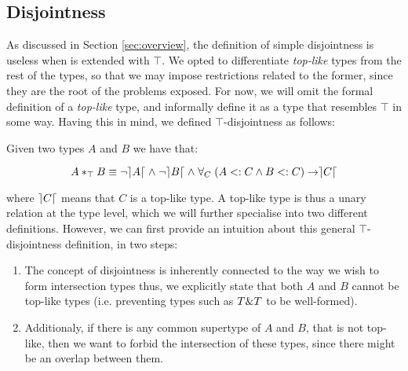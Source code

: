
\subsection{Disjointness} 
As discussed in Section \ref{sec:overview}, the definition of
simple disjointness is useless when \name is extended with $\top$.
We opted to differentiate \emph{top-like} types from the rest of the types,
so that we may impose restrictions related to the former, since they are the 
root of the problems exposed.
For now, we will omit the formal definition of a \emph{top-like} type, and informally
define it as a type that resembles $\top$ in some way. 
Having this in mind, we defined $\top$-disjointness as follows:
\begin{definition}
Given two types $A$ and $B$ we have that:

\[A *_{\top} B \equiv \neg \rceil A \lceil \; \wedge \; \neg \rceil B \lceil \; \wedge \; 
\forall_C \; ( A <: C \wedge B <: C ) \rightarrow \rceil C \lceil \]

\end{definition}
\noindent where $\rceil C \lceil$ means that $C$ is a top-like type.
A top-like type is thus a unary relation at the type level, which we will further specialise into two different definitions. 
However, we can first provide an intuition about this general $\top$-disjointness definition, in two steps:
\begin{enumerate}
\item The concept of disjointness is inherently connected to the way we wish to form intersection types thus,
we explicitly state that both $A$ and $B$ cannot be top-like types (i.e. preventing types such as $T \& T$ to be well-formed).
\item Additionaly, if there is any common supertype of $A$ and $B$, that is not top-like, then we want to forbid the 
intersection of these types, since there might be an overlap between them. 
\end{enumerate}

